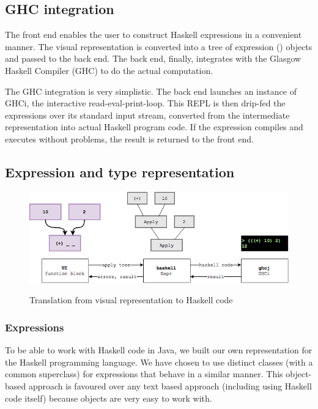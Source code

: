 \subsection{GHC integration}

The front end enables the user to construct Haskell expressions in a convenient manner.
The visual representation is converted into a tree of expression () objects and passed to the back end. 
The back end, finally, integrates with the Glasgow Haskell Compiler (\gls{GHC}) to do the actual computation.

The GHC integration is very simplistic.
The back end launches an instance of GHCi, the interactive read-eval-print-loop. 
This \gls{REPL} is then drip-fed the expressions over its standard input stream, converted from the intermediate representation into actual Haskell program code.
If the expression compiles and executes without problems, the result is returned to the front end.

\subsection{Expression and type representation}

\begin{figure}[h]
	\centering
	\includegraphics[scale=0.5]{Images/exprtohaskell}
	\label{fig:classdiagram-expr}
	\caption{Translation from visual representation to Haskell code}
\end{figure}

\subsubsection{Expressions}
 

To be able to work with Haskell code in Java, we built our own representation for the Haskell programming language.
We have chosen to use distinct classes (with a common superclass) for expressions that behave in a similar manner.
This object-based approach is favoured over any text based approach (including using Haskell code itself) because objects are very easy to work with.

